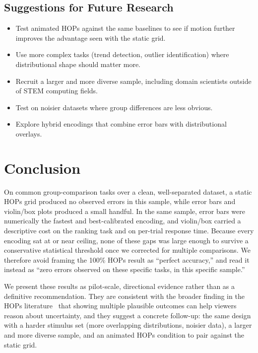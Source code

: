 \documentclass{article}
\begin{document}
\subsection{Suggestions for Future Research}

\begin{itemize}[leftmargin=*, itemsep=4pt]
\item Test animated HOPs against the same baselines to see if motion
  further improves the advantage seen with the static grid.
\item Use more complex tasks (trend detection, outlier identification)
  where distributional shape should matter more.
\item Recruit a larger and more diverse sample, including domain
  scientists outside of STEM computing fields.
\item Test on noisier datasets where group differences are less
  obvious.
\item Explore hybrid encodings that combine error bars with
  distributional overlays.
\end{itemize}

\section{Conclusion}

On common group-comparison tasks over a clean, well-separated dataset,
a static HOPs grid produced no observed errors in this sample, while
error bars and violin/box plots produced a small handful.  In the
same sample, error bars were numerically the fastest and
best-calibrated encoding, and violin/box carried a descriptive cost on
the ranking task and on per-trial response time.  Because every
encoding sat at or near ceiling, none of these gaps was large enough
to survive a conservative statistical threshold once we corrected for
multiple comparisons.  We therefore avoid framing the 100\% HOPs
result as ``perfect accuracy,'' and read it instead as ``zero errors
observed on these specific tasks, in this specific sample.''

We present these results as pilot-scale, directional evidence rather
than as a definitive recommendation.  They are consistent with the
broader finding in the HOPs literature~\cite{hullman2015} that
showing multiple plausible outcomes can help viewers reason about
uncertainty, and they suggest a concrete follow-up: the same design
with a harder stimulus set (more overlapping distributions, noisier
data), a larger and more diverse sample, and an animated HOPs
condition to pair against the static grid.
\end{document}
